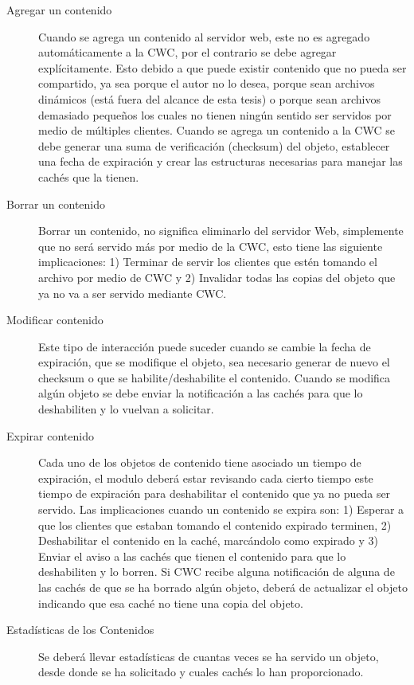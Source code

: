 \begin{description}
\item[Agregar un contenido] Cuando se agrega un contenido al servidor web, este no es agregado automáticamente a la CWC, por el contrario se debe agregar explícitamente. Esto debido a que puede existir contenido que no pueda ser compartido, ya sea porque el autor no lo desea, porque sean archivos dinámicos (está fuera del alcance de esta tesis) o porque sean archivos demasiado pequeños los cuales no tienen ningún sentido ser servidos por medio de múltiples clientes. Cuando se agrega un contenido a la CWC se debe generar una suma de verificación (checksum) del objeto, establecer una fecha de expiración y crear las estructuras necesarias para manejar las cachés que la tienen.

\item[Borrar un contenido] Borrar un contenido, no significa eliminarlo del servidor Web, simplemente que no será servido más por medio de la CWC, esto tiene las siguiente implicaciones: 1) Terminar de servir los clientes que estén tomando el archivo por medio de CWC y 2) Invalidar todas las copias del objeto que ya no va a ser servido mediante CWC.

\item [Modificar contenido] Este tipo de interacción puede suceder cuando se cambie la fecha de expiración, que se modifique el objeto, sea necesario generar de nuevo el checksum o que se habilite/deshabilite el contenido. Cuando se modifica algún objeto se debe enviar la notificación a las cachés para que lo deshabiliten y lo vuelvan a solicitar.

\item [Expirar contenido] Cada uno de los objetos de contenido tiene asociado un tiempo de expiración, el modulo deberá estar revisando cada cierto tiempo este tiempo de expiración para deshabilitar el contenido que ya no pueda ser servido. Las implicaciones cuando un contenido se expira son: 1) Esperar a que los clientes que estaban tomando el contenido expirado terminen, 2) Deshabilitar el contenido en la caché, marcándolo como expirado y 3) Enviar el aviso a las cachés que tienen el contenido para que lo deshabiliten y lo borren.
Si CWC recibe alguna notificación de alguna de las cachés de que se ha borrado algún objeto, deberá de actualizar el objeto indicando que esa caché no tiene una copia del objeto.

\item[Estadísticas de los Contenidos] Se deberá llevar estadísticas de cuantas veces se ha servido un objeto, desde donde se ha solicitado y cuales cachés lo han proporcionado.
\end{description}


